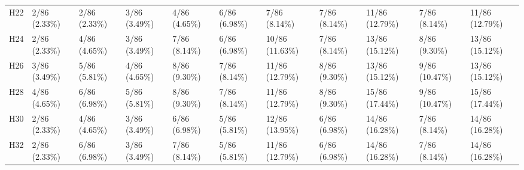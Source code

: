 \begin{table}[tbp]
\begin{tabular}{lllllllllll}
H22 & 2/86 (2.33\%) & 2/86 (2.33\%) & 3/86 (3.49\%) & 4/86 (4.65\%) & 6/86 (6.98\%) & 7/86 (8.14\%) & 7/86 (8.14\%) & 11/86 (12.79\%) & 7/86 (8.14\%) & 11/86 (12.79\%) \\
H24 & 2/86 (2.33\%) & 4/86 (4.65\%) & 3/86 (3.49\%) & 7/86 (8.14\%) & 6/86 (6.98\%) & 10/86 (11.63\%) & 7/86 (8.14\%) & 13/86 (15.12\%) & 8/86 (9.30\%) & 13/86 (15.12\%) \\
H26 & 3/86 (3.49\%) & 5/86 (5.81\%) & 4/86 (4.65\%) & 8/86 (9.30\%) & 7/86 (8.14\%) & 11/86 (12.79\%) & 8/86 (9.30\%) & 13/86 (15.12\%) & 9/86 (10.47\%) & 13/86 (15.12\%) \\
H28 & 4/86 (4.65\%) & 6/86 (6.98\%) & 5/86 (5.81\%) & 8/86 (9.30\%) & 7/86 (8.14\%) & 11/86 (12.79\%) & 8/86 (9.30\%) & 15/86 (17.44\%) & 9/86 (10.47\%) & 15/86 (17.44\%) \\
H30 & 2/86 (2.33\%) & 4/86 (4.65\%) & 3/86 (3.49\%) & 6/86 (6.98\%) & 5/86 (5.81\%) & 12/86 (13.95\%) & 6/86 (6.98\%) & 14/86 (16.28\%) & 7/86 (8.14\%) & 14/86 (16.28\%) \\
H32 & 2/86 (2.33\%) & 6/86 (6.98\%) & 3/86 (3.49\%) & 7/86 (8.14\%) & 5/86 (5.81\%) & 11/86 (12.79\%) & 6/86 (6.98\%) & 14/86 (16.28\%) & 7/86 (8.14\%) & 14/86 (16.28\%) \\
\bottomrule
\end{tabular}
\end{table}
